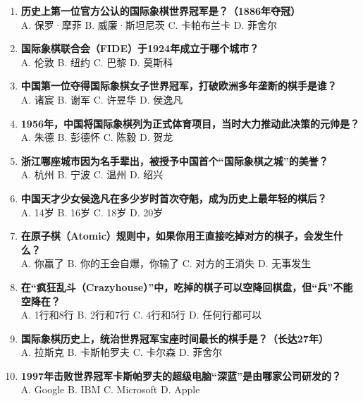 \documentclass[a4paper, 11pt]{ctexart}
\begin{document}
\begin{enumerate}[label=\arabic*., itemsep=1.5em]
    \item \textbf{历史上第一位官方公认的国际象棋世界冠军是？（1886年夺冠）} \\
    A. 保罗·摩菲 \qquad B. 威廉·斯坦尼茨 \qquad C. 卡帕布兰卡 \qquad D. 菲舍尔

    \item \textbf{国际象棋联合会（FIDE）于1924年成立于哪个城市？} \\
    A. 伦敦 \qquad B. 纽约 \qquad C. 巴黎 \qquad D. 莫斯科

    \item \textbf{中国第一位夺得国际象棋女子世界冠军，打破欧洲多年垄断的棋手是谁？} \\
    A. 诸宸 \qquad B. 谢军 \qquad C. 许昱华 \qquad D. 侯逸凡

    \item \textbf{1956年，中国将国际象棋列为正式体育项目，当时大力推动此决策的元帅是？} \\
    A. 朱德 \qquad B. 彭德怀 \qquad C. 陈毅 \qquad D. 贺龙

    \item \textbf{浙江哪座城市因为名手辈出，被授予中国首个“国际象棋之城”的美誉？} \\
    A. 杭州 \qquad B. 宁波 \qquad C. 温州 \qquad D. 绍兴

    \item \textbf{中国天才少女侯逸凡在多少岁时首次夺魁，成为历史上最年轻的棋后？} \\
    A. 14岁 \qquad B. 16岁 \qquad C. 18岁 \qquad D. 20岁

    \item \textbf{在原子棋（Atomic）规则中，如果你用王直接吃掉对方的棋子，会发生什么？} \\
    A. 你赢了 \qquad B. 你的王会自爆，你输了 \qquad C. 对方的王消失 \qquad D. 无事发生

    \item \textbf{在“疯狂乱斗（Crazyhouse）”中，吃掉的棋子可以空降回棋盘，但“兵”不能空降在？} \\
    A. 1行和8行 \qquad B. 2行和7行 \qquad C. 4行和5行 \qquad D. 任何行都可以

    \item \textbf{国际象棋历史上，统治世界冠军宝座时间最长的棋手是？（长达27年）} \\
    A. 拉斯克 \qquad B. 卡斯帕罗夫 \qquad C. 卡尔森 \qquad D. 菲舍尔

    \item \textbf{1997年击败世界冠军卡斯帕罗夫的超级电脑“深蓝”是由哪家公司研发的？} \\
    A. Google \qquad B. IBM \qquad C. Microsoft \qquad D. Apple


\end{enumerate}
\end{document}
